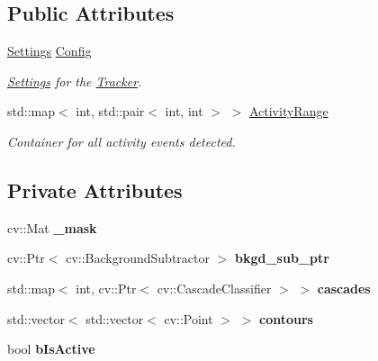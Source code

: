 \subsection*{Public Attributes}
\begin{DoxyCompactItemize}
\item 
\mbox{\label{class_tracker_a6d21d806bb478c2e6f715e56fde8f8e3}} 
\mbox{\hyperlink{struct_tracker_1_1_settings}{Settings}} \mbox{\hyperlink{class_tracker_a6d21d806bb478c2e6f715e56fde8f8e3}{Config}}
\begin{DoxyCompactList}\small\item\em \mbox{\hyperlink{struct_tracker_1_1_settings}{Settings}} for the \mbox{\hyperlink{class_tracker}{Tracker}}. \end{DoxyCompactList}\item 
\mbox{\label{class_tracker_aecd139022e2b7399105171b58834df82}} 
std\+::map$<$ int, std\+::pair$<$ int, int $>$ $>$ \mbox{\hyperlink{class_tracker_aecd139022e2b7399105171b58834df82}{Activity\+Range}}
\begin{DoxyCompactList}\small\item\em Container for all activity events detected. \end{DoxyCompactList}\end{DoxyCompactItemize}
\subsection*{Private Attributes}
\begin{DoxyCompactItemize}
\item 
\mbox{\label{class_tracker_aa111fa20fe3a86d131947652a0d3b6ea}} 
cv\+::\+Mat {\bfseries \+\_\+mask}
\item 
\mbox{\label{class_tracker_a77b77b401cf8175721fb49f226a7a64c}} 
cv\+::\+Ptr$<$ cv\+::\+Background\+Subtractor $>$ {\bfseries bkgd\+\_\+sub\+\_\+ptr}
\item 
\mbox{\label{class_tracker_ae84482bc6e44529e83983cd99990c0ac}} 
std\+::map$<$ int, cv\+::\+Ptr$<$ cv\+::\+Cascade\+Classifier $>$ $>$ {\bfseries cascades}
\item 
\mbox{\label{class_tracker_a8fea1b0afbc9e3014021c113891f7ae6}} 
std\+::vector$<$ std\+::vector$<$ cv\+::\+Point $>$ $>$ {\bfseries contours}
\item 
\mbox{\label{class_tracker_a23d6a1f1ffc8e56ea54d923fe0f06887}} 
bool {\bfseries b\+Is\+Active}
\end{DoxyCompactItemize}


